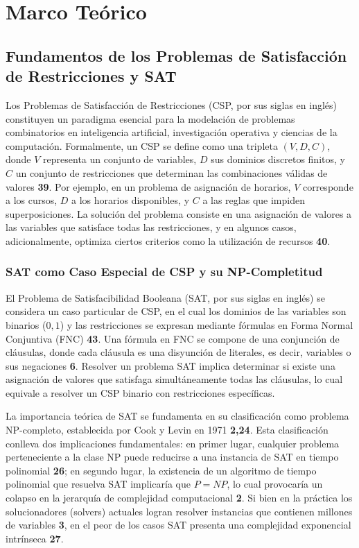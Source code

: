\chapter{Marco Teórico}\label{chapter:state-of-the-art}

\section{Fundamentos de los Problemas de Satisfacción de Restricciones y SAT}
\label{sec:fundamentos-sat-csp}

Los Problemas de Satisfacción de Restricciones (CSP, por sus siglas en inglés) constituyen un paradigma esencial para la modelación de problemas combinatorios en inteligencia artificial, investigación operativa y ciencias de la computación. Formalmente, un CSP se define como una tripleta $(V,D,C)$, donde $V$ representa un conjunto de variables, $D$ sus dominios discretos finitos, y $C$ un conjunto de restricciones que determinan las combinaciones válidas de valores \textbf{39}. Por ejemplo, en un problema de asignación de horarios, $V$ corresponde a los cursos, $D$ a los horarios disponibles, y $C$ a las reglas que impiden superposiciones. La solución del problema consiste en una asignación de valores a las variables que satisface todas las restricciones, y en algunos casos, adicionalmente, optimiza ciertos criterios como la utilización de recursos \textbf{40}.

\subsection{SAT como Caso Especial de CSP y su NP-Completitud}
El Problema de Satisfacibilidad Booleana (SAT, por sus siglas en inglés) se considera un caso particular de CSP, en el cual los dominios de las variables son binarios (${0,1}$) y las restricciones se expresan mediante fórmulas en Forma Normal Conjuntiva (FNC) \textbf{43}. Una fórmula en FNC se compone de una conjunción de cláusulas, donde cada cláusula es una disyunción de literales, es decir, variables o sus negaciones \textbf{6}. Resolver un problema SAT implica determinar si existe una asignación de valores que satisfaga simultáneamente todas las cláusulas, lo cual equivale a resolver un CSP binario con restricciones específicas.

La importancia teórica de SAT se fundamenta en su clasificación como problema NP-completo, establecida por Cook y Levin en 1971 \textbf{2,24}. Esta clasificación conlleva dos implicaciones fundamentales: en primer lugar, cualquier problema perteneciente a la clase NP puede reducirse a una instancia de SAT en tiempo polinomial \textbf{26}; en segundo lugar, la existencia de un algoritmo de tiempo polinomial que resuelva SAT implicaría que $P=NP$, lo cual provocaría un colapso en la jerarquía de complejidad computacional \textbf{2}. Si bien en la práctica los solucionadores (solvers) actuales logran resolver instancias que contienen millones de variables \textbf{3}, en el peor de los casos SAT presenta una complejidad exponencial intrínseca \textbf{27}.


